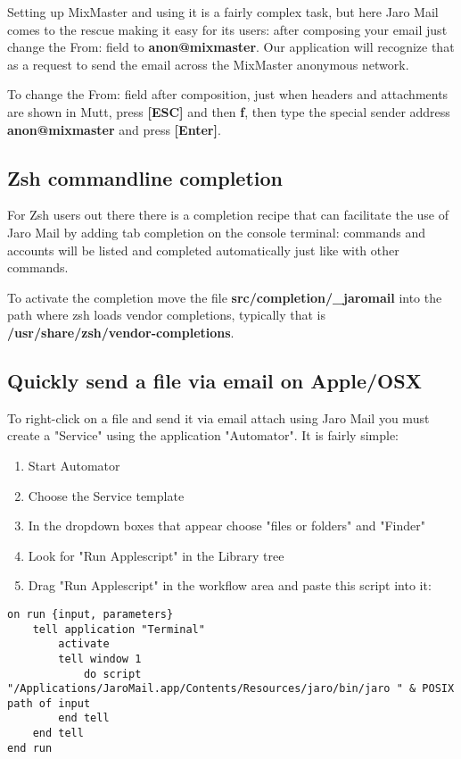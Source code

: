 \documentclass[a4,onecolumn,portrait]{article}
\begin{document}
Setting up MixMaster and using it is a fairly complex task, but
here Jaro Mail comes to the rescue making it easy for its users:
after composing your email just change the From: field to
\textbf{anon@mixmaster}. Our application will recognize that as a request
to send the email across the MixMaster anonymous network.

To change the From: field after composition, just when headers and
attachments are shown in Mutt, press \textbf{[ESC]} and then \textbf{f}, then
type the special sender address \textbf{anon@mixmaster} and press \textbf{[Enter]}.
\subsection{Zsh commandline completion}
\label{sec-12-3}

For Zsh users out there there is a completion recipe that can
facilitate the use of Jaro Mail by adding tab completion on the
console terminal: commands and accounts will be listed and
completed automatically just like with other commands.

To activate the completion move the file \textbf{src/completion/\_jaromail}
into the path where zsh loads vendor completions, typically that is
\textbf{/usr/share/zsh/vendor-completions}.
\subsection{Quickly send a file via email on Apple/OSX}
\label{sec-12-4}

To right-click on a file and send it via email attach using Jaro
Mail you must create a "Service" using the application
"Automator". It is fairly simple:

\begin{enumerate}
\item Start Automator
\item Choose the Service template
\item In the dropdown boxes that appear choose "files or folders" and "Finder"
\item Look for "Run Applescript" in the Library tree
\item Drag "Run Applescript" in the workflow area and paste this script into it:
\end{enumerate}

\begin{verbatim}
on run {input, parameters}
	tell application "Terminal"
		activate
		tell window 1
			do script "/Applications/JaroMail.app/Contents/Resources/jaro/bin/jaro " & POSIX path of input
		end tell
	end tell
end run
\end{verbatim}
\end{document}
